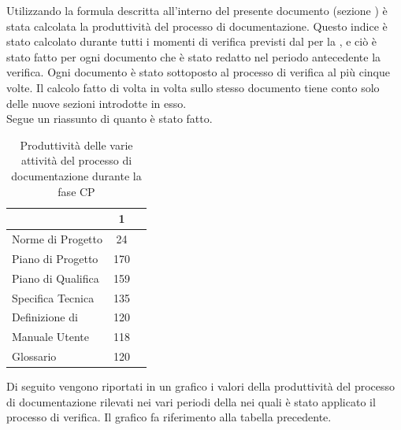 Utilizzando la formula descritta all'interno del presente documento (sezione ) è stata calcolata la produttività del processo di documentazione. Questo indice è stato calcolato durante tutti i momenti di verifica previsti dal  per la , e ciò è stato fatto per ogni documento che è stato redatto nel periodo antecedente la verifica. Ogni documento è stato sottoposto al processo di verifica al più cinque volte. Il calcolo fatto di volta in volta sullo stesso documento tiene conto solo delle nuove sezioni introdotte in esso.\\
Segue un riassunto di quanto è stato fatto.
\begin{table}[H]
      \centering
		\begin{tabu}{| l | c | c |}
		\hline
		&1	\\ \hline
		Norme di Progetto	& 24  \\ \hline
		Piano di Progetto	& 170 \\ \hline
		Piano di Qualifica	& 159\\ \hline
		Specifica Tecnica & 135  \\ \hline
		Definizione di  & 120 \\ \hline
		Manuale Utente & 118 \\ \hline
		Glossario & 120\\ \hline
		\end{tabu}
		\caption{Produttività delle varie attività del processo di documentazione durante la fase CP}
\end{table}
Di seguito vengono riportati in un grafico i valori della produttività del processo di documentazione rilevati nei vari periodi della  nei quali è stato applicato il processo di verifica. Il grafico fa riferimento alla tabella precedente.\\

